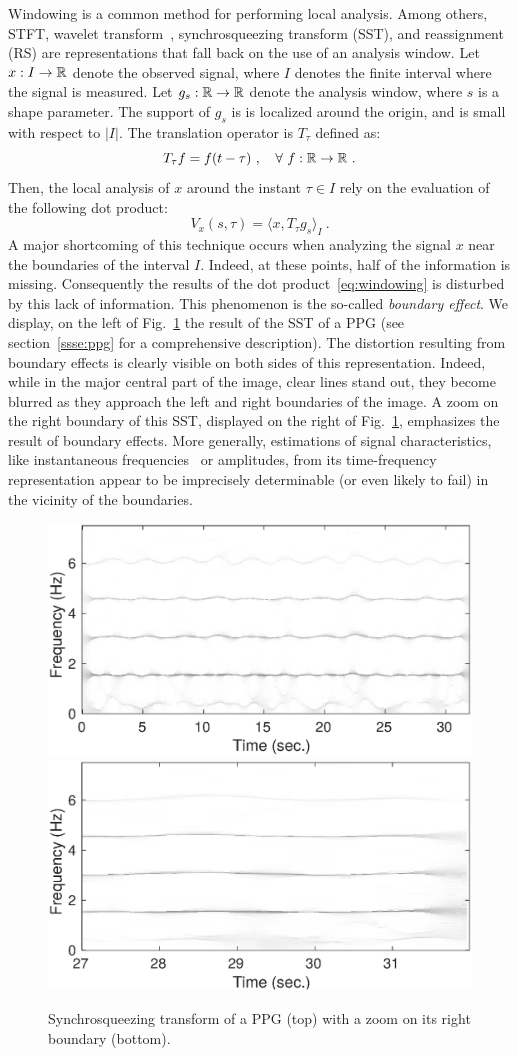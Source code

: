 \documentclass[journal]{IEEEtran}
\begin{document}
Windowing is a common method for performing local analysis. Among others, STFT, wavelet transform~\cite{Mallat99wavelet}, synchrosqueezing transform (SST), and reassignment~\cite{Auger13time} (RS) are representations that fall back on the use of an analysis window. Let $x:I\to{\mathbb R}$ denote the observed signal, where $I$ denotes the finite interval where the signal is measured. Let $g_s:{\mathbb R}\to{\mathbb R}$ denote the analysis window, where $s$ is a shape parameter. The support of $g_s$ is is localized around the origin, and is small with respect to $|I|$. The translation operator is $T_\tau$ defined as:
\[
T_\tau f = f(t-\tau)\ ,\quad \forall\ f:{\mathbb R}\to{\mathbb R}\ .
\]
Then, the local analysis of $x$ around the instant $\tau\in I$ rely on the evaluation of the following dot product:
\begin{equation}
V_x(s,\tau) = \langle x, T_\tau g_s \rangle_I \ .
\label{eq:windowing}
\end{equation}
A major shortcoming of this technique occurs when analyzing the signal $x$ near the boundaries of the interval $I$. Indeed, at these points, half of the information is missing. Consequently the results of the dot product~\ref{eq:windowing} is disturbed by this lack of information. This phenomenon is the so-called \emph{boundary effect}. We display, on the left of Fig.~\ref{fig:ex.intro} the result of the SST of a PPG (see section~\ref{ssse:ppg} for a comprehensive description). The distortion resulting from boundary effects is clearly visible on both sides of this representation. Indeed, while in the major central part of the image, clear lines stand out, they become blurred as they approach the left and right boundaries of the image. A zoom on the right boundary of this SST, displayed on the right of Fig.~\ref{fig:ex.intro}, emphasizes the result of boundary effects. More generally, estimations of signal characteristics, like instantaneous frequencies~\cite{Delprat92asymptotic} or amplitudes, from its time-frequency representation appear to be imprecisely determinable (or even likely to fail) in the vicinity of the boundaries.

\begin{figure}
\centering
\includegraphics[width=.48\textwidth]{SSTintro.eps}
\includegraphics[width=.48\textwidth]{zoomSSTintro.eps}
\caption{Synchrosqueezing transform of a PPG (top) with a zoom on its right boundary (bottom). }
\label{fig:ex.intro}
\end{figure}
\end{document}
